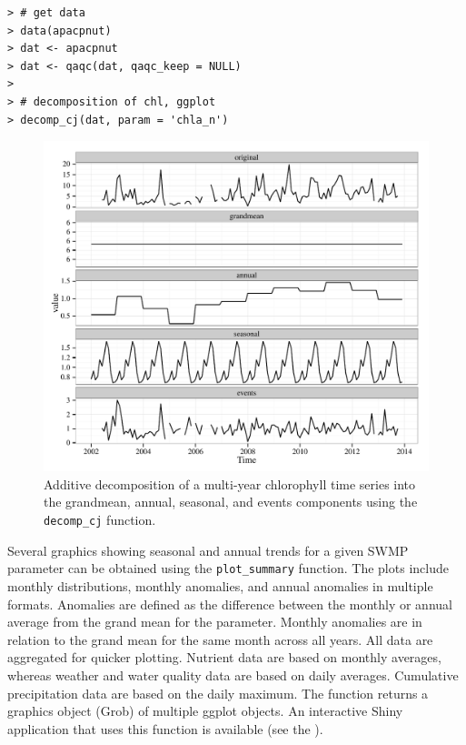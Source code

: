 \documentclass[10pt,letterpaper]{article}\usepackage[]{graphicx}\usepackage[]{color}
\makeatletter
\def\maxwidth{ %
  \ifdim\Gin@nat@width>\linewidth
    \linewidth
  \else
    \Gin@nat@width
  \fi
}
\newenvironment{kframe}{%
 \def\at@end@of@kframe{}%
 \ifinner\ifhmode%
  \def\at@end@of@kframe{\end{minipage}}%
  \begin{minipage}{\columnwidth}%
 \fi\fi%
 \def\FrameCommand##1{\hskip\@totalleftmargin \hskip-\fboxsep
 \colorbox{shadecolor}{##1}\hskip-\fboxsep
     \hskip-\linewidth \hskip-\@totalleftmargin \hskip\columnwidth}%
 \MakeFramed {\advance\hsize-\width
   \@totalleftmargin\z@ \linewidth\hsize
   \@setminipage}}%
 {\par\unskip\endMakeFramed%
 \at@end@of@kframe}
\newenvironment{knitrout}{}{} %
\makeatother
\begin{document}
\begin{knitrout}
\color{fgcolor}\begin{kframe}
\begin{verbatim}
> # get data
> data(apacpnut)
> dat <- apacpnut
> dat <- qaqc(dat, qaqc_keep = NULL)
> 
> # decomposition of chl, ggplot
> decomp_cj(dat, param = 'chla_n')
\end{verbatim}
\end{kframe}\begin{figure}[!ht]


{\centering \includegraphics[width=\maxwidth]{figure/decomp_ex2} 

}

\caption[Additive decomposition of a multi-year chlorophyll time series into the grandmean, annual, seasonal, and events components using the \texttt{decomp\_cj} function]{Additive decomposition of a multi-year chlorophyll time series into the grandmean, annual, seasonal, and events components using the \texttt{decomp\_cj} function.\label{fig:decomp_ex2}}
\end{figure}


\end{knitrout}

Several graphics showing seasonal and annual trends for a given SWMP parameter can be obtained using the \texttt{plot\_summary} function.  The plots include monthly distributions, monthly anomalies, and annual anomalies in multiple formats.  Anomalies are defined as the difference between the monthly or annual average from the grand mean for the parameter.  Monthly anomalies are in relation to the grand mean for the same month across all years.  All data are aggregated for quicker plotting.  Nutrient data are based on monthly averages, whereas weather and water quality data are based on daily averages.  Cumulative precipitation data are based on the daily maximum. The function returns a graphics object (Grob) of multiple ggplot objects.  An interactive Shiny application \cite{shiny15} that uses this function is available (see the ).
\end{document}
